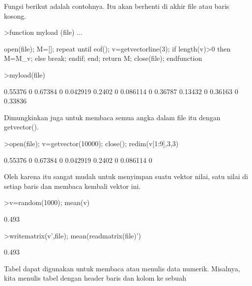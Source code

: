 \documentclass[a4paper,10pt]{article}
\begin{document}
\begin{eulernotebook}
\begin{eulercomment}
\begin{eulercomment}
\begin{eulercomment}
\begin{eulercomment}
\begin{eulercomment}
\begin{eulercomment}
\begin{eulercomment}
\begin{eulercomment}
\begin{eulercomment}
\begin{eulercomment}
\begin{eulercomment}
\begin{eulercomment}
\begin{eulercomment}
\begin{eulercomment}
\begin{eulercomment}
\begin{eulercomment}
\begin{eulercomment}
Fungsi berikut adalah contohnya. Itu akan berhenti di akhir file atau
baris kosong.
\end{eulercomment}
\begin{eulerprompt}
>function myload (file) ...
\end{eulerprompt}
\begin{eulerudf}
  open(file);
  M=[];
  repeat
     until eof();
     v=getvectorline(3);
     if length(v)>0 then M=M_v; else break; endif;
  end;
  return M;
  close(file);
  endfunction
\end{eulerudf}
\begin{eulerprompt}
>myload(file)
\end{eulerprompt}
\begin{euleroutput}
    0.55376         0   0.67384         0  0.042919 
     0.2402         0  0.086114         0   0.36787 
    0.13432         0   0.36163         0   0.33836 
\end{euleroutput}
\begin{eulercomment}
Dimungkinkan juga untuk membaca semua angka dalam file itu dengan
getvector().
\end{eulercomment}
\begin{eulerprompt}
>open(file); v=getvector(10000); close(); redim(v[1:9],3,3)
\end{eulerprompt}
\begin{euleroutput}
    0.55376         0   0.67384 
          0  0.042919    0.2402 
          0  0.086114         0 
\end{euleroutput}
\begin{eulercomment}
Oleh karena itu sangat mudah untuk menyimpan suatu vektor nilai, satu
nilai di setiap baris dan membaca kembali vektor ini.
\end{eulercomment}
\begin{eulerprompt}
>v=random(1000); mean(v)
\end{eulerprompt}
\begin{euleroutput}
  0.493
\end{euleroutput}
\begin{eulerprompt}
>writematrix(v',file); mean(readmatrix(file)')
\end{eulerprompt}
\begin{euleroutput}
  0.493
\end{euleroutput}
\begin{eulercomment}
Tabel dapat digunakan untuk membaca atau menulis data numerik.
Misalnya, kita menulis tabel dengan header baris dan kolom ke sebuah

\end{eulercomment}
\end{eulercomment}
\end{eulercomment}
\end{eulercomment}
\end{eulercomment}
\end{eulercomment}
\end{eulercomment}
\end{eulercomment}
\end{eulercomment}
\end{eulercomment}
\end{eulercomment}
\end{eulercomment}
\end{eulercomment}
\end{eulercomment}
\end{eulercomment}
\end{eulercomment}
\end{eulercomment}
\end{eulernotebook}
\end{document}
